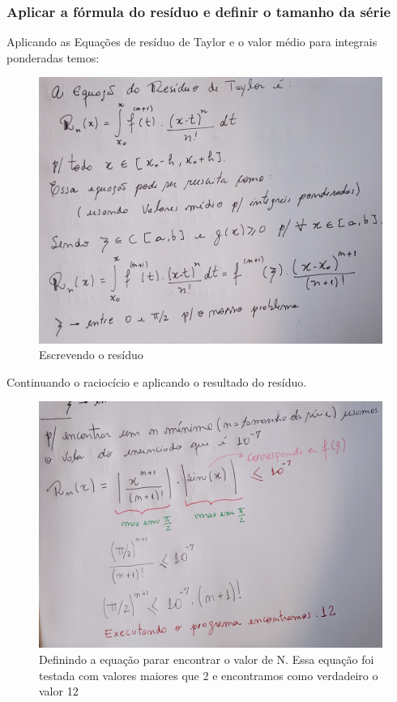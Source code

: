 \subsubsection{Aplicar a fórmula do resíduo e definir o tamanho da série}
Aplicando as Equações de resíduo de Taylor e o valor médio para integrais ponderadas temos:
\begin{figure}[H]
    \centering
    \includegraphics[width=.80\textwidth]{imagens/exercicio3_parte_2}
    \caption{Escrevendo o resíduo}
    \label{fig:lista_exercicio3_parte2}
\end{figure}
Continuando o raciocício e aplicando o resultado do resíduo.
\begin{figure}[H]
    \centering
    \includegraphics[width=.80\textwidth]{imagens/exercicio3_parte_3}
    \caption{Definindo a equação parar encontrar o valor de N. Essa equação foi testada com valores maiores que 2 e encontramos como verdadeiro o valor 12}
    \label{fig:lista_exercicio3_parte3}
\end{figure}



